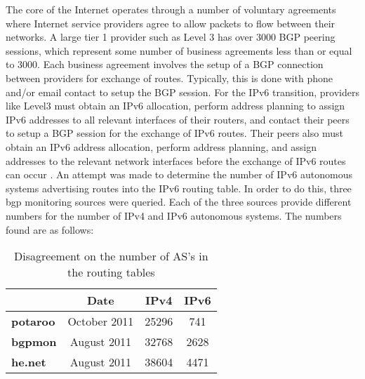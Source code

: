 The core of the Internet operates through a number of voluntary
agreements where Internet service providers agree to allow packets
to flow between their networks.  A large tier
1 provider such as Level 3 has over 3000 BGP peering sessions,
which represent some number of business agreements less than or
equal to 3000.  Each business agreement involves the
setup of a BGP connection between providers for exchange of routes.
Typically, this is done with phone and/or email contact to setup
the BGP session.  For the IPv6 transition, providers like Level3
must obtain an IPv6 allocation, perform address planning to assign
IPv6 addresses to all relevant interfaces of their routers, and
contact their peers to setup a BGP session for the exchange of IPv6
routes.  Their peers also must obtain an IPv6 address allocation,
perform address planning, and assign addresses to the relevant
network interfaces before the exchange of IPv6 routes can occur
\cite{Peering02}.  An attempt was
made to determine the number of IPv6 autonomous systems advertising
routes into the IPv6 routing table.  In order to do this, three
bgp monitoring sources were queried.
Each of the three sources provide different numbers for the number of
IPv4 and IPv6 autonomous systems.  The numbers found are as follows:

\begin{table}[htp]
\begin{center}
\begin{tabular}{| l | c | c | c |}
\hline
 & \textbf{Date} & \textbf{IPv4} & \textbf{IPv6}  \\
\hline
 \textbf{potaroo} & October 2011 & 25296 & 741  \\
\hline
 \textbf{bgpmon} & August 2011  & 32768 & 2628 \\
\hline
\textbf{he.net} & August 2011 & 38604 & 4471 \\
\hline
\end{tabular}
\caption{Disagreement on the number of AS's in the routing tables}
\label{tab:template}
\end{center}
\end{table}

